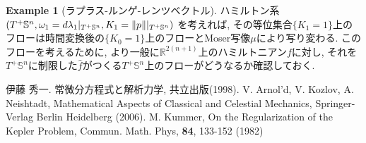 \documentclass[a4paper]{ujarticle}
\numberwithin{equation}{section}
\theoremstyle{definition}
\newtheorem{example}{Example}
\begin{document}
\begin{example}[ラプラス-ルンゲ-レンツベクトル]
            ハミルトン系$(T^{+}\mathbb{S}^{n}, \omega_1 = d \lambda_1|_{T^{+} \mathbb{S}^{n}}, K_1 = \norm{p}|_{T^{+} \mathbb{S}^n})$
            を考えれば, その等位集合$\{K_1 = 1\}$上のフローは時間変換後の$\{K_0 = 1\}$上のフローとMoser写像$\mu$により写り変わる.
            このフローを考えるために, より一般に$\mathbb{R}^{2(n+1)}$上のハミルトニアン$f$に対し, 
            それを$T^{+} \mathbb{S}^{n}$に制限した$\hat{f}$がつくる$T^{+} \mathbb{S}^{n}$上のフローがどうなるか確認しておく.

        \end{example}
    \begin{thebibliography}{10}
    \nocite{*}
	 伊藤 秀一. 常微分方程式と解析力学, 共立出版(1998).
     V. Arnol'd, V. Kozlov, A. Neishtadt, Mathematical Aspects of Classical and Celestial Mechanics, Springer-Verlag Berlin Heidelberg (2006).
     M. Kummer, On the Regularization of the Kepler Problem, Commun. Math. Phys, \textbf{84}, 133-152 (1982)
\end{thebibliography}
\end{document}
